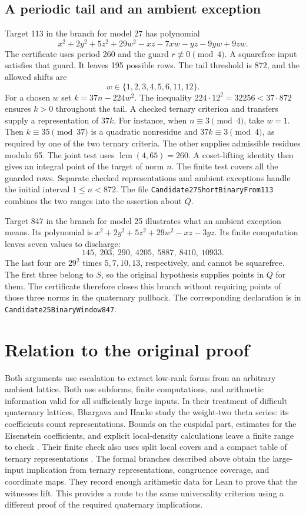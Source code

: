 \documentclass[11pt,a4paper]{article}
\newcommand{\code}[1]{\texttt{#1}}
\begin{document}
\subsection{A periodic tail and an ambient exception}
Target 113 in the branch for model 27 has polynomial
\[
 x^2+2y^2+5z^2+29w^2-xz-7xw-yz-9yw+9zw .
\]
The certificate uses
period 260 and the guard $r\not\equiv0\pmod4$.
A squarefree input satisfies that guard. It leaves 195 possible rows.
The tail threshold is $872$, and the allowed shifts are
\[
                   w\in\{1,2,3,4,5,6,11,12\}.
\]
For a chosen $w$ set $k=37n-224w^2$. The inequality
$224\cdot12^2=32256<37\cdot872$ ensures $k>0$ throughout the tail.
A checked ternary criterion and transfers supply a representation of
$37k$. For instance, when $n\equiv3\pmod4$, take $w=1$.
Then $k\equiv35\pmod{37}$ is a quadratic nonresidue and
$37k\equiv3\pmod4$, as required by one of the two ternary criteria.
The other supplies admissible residues modulo 65. The joint test uses
$\operatorname{lcm}(4,65)=260$. A coset-lifting identity then gives an integral point of the
target of norm $n$. The finite test covers all the guarded rows.
Separate checked representations and ambient exceptions handle the
initial interval $1\le n<872$. The file \code{Candidate27ShortBinaryFrom113}
combines the two ranges into the assertion about $Q$.

Target 847 in the branch for model 25 illustrates what an ambient
exception means. Its polynomial is $x^2+2y^2+5z^2+29w^2-xz-3yz$.
Its finite computation leaves seven values to discharge:
\[
                 145,\ 203,\ 290,\ 4205,\ 5887,\ 8410,\ 10933.
\]
The last four are $29^2$ times $5,7,10,13$, respectively, and cannot be
squarefree. The first three belong to $S$, so the original
hypothesis supplies points in $Q$ for them. The certificate therefore
closes this branch without requiring points of those three norms in
the quaternary pullback. The corresponding declaration is in
\code{Candidate25BinaryWindow847}.

\section{Relation to the original proof}
Both arguments use escalation to extract low-rank forms from an
arbitrary ambient lattice. Both use subforms, finite computations, and
arithmetic information valid for all sufficiently large inputs. In their
treatment of difficult quaternary lattices, Bhargava and Hanke study
the weight-two theta series: its coefficients count representations.
Bounds on the cuspidal part, estimates for the Eisenstein coefficients,
and explicit local-density calculations leave a finite range to check
\cite[\S\S4.2--4.4]{BH}. Their finite check also uses split local
covers and a compact table of ternary representations
\cite[\S4.3.2]{BH}. The formal branches described above obtain the
large-input implication from ternary representations, congruence
coverage, and coordinate maps. They record enough arithmetic data for
Lean to prove that the witnesses lift. This provides a route to the same
universality criterion using a different proof of the required
quaternary implications.
\end{document}
